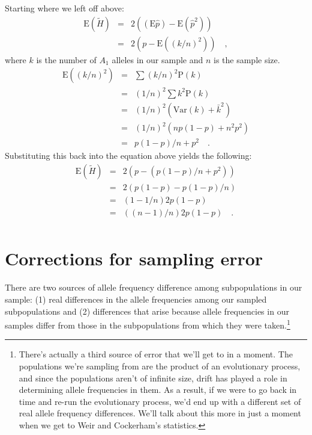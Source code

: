 \documentclass[12pt]{article}
\begin{document}
Starting where we left off above:
\begin{eqnarray*}
\mbox{E}(\tilde H) &=& 2\left((\mbox{E}\hat p) - \mbox{E}({\hat p}^2)\right) \\
     &=& 2\left(p - \mbox{E}\left((k/n)^2\right)\right) \quad ,
\end{eqnarray*}
where $k$ is the number of $A_1$ alleles in our sample and $n$ is the
sample size.
\begin{eqnarray*}
\mbox{E}\left((k/n)^2\right) &=& \sum (k/n)^2 \mbox{P}(k) \\
                      &=& (1/n)^2 \sum k^2 \mbox{P}(k) \\
                      &=& (1/n)^2 \left(\mbox{Var}(k) + \bar k^2\right) \\
                      &=& (1/n)^2 \left(np(1-p) + n^2p^2\right) \\
                      &=& p(1-p)/n + p^2 \quad .
\end{eqnarray*}
Substituting this back into the equation above yields the following:
\begin{eqnarray*}
\mbox{E}(\tilde H) &=& 2\left(p - \left(p(1-p)/n + p^2\right)\right) \\
     &=& 2\left(p(1-p) - p(1-p)/n\right) \\
     &=& \left(1 - 1/n\right)2p(1-p) \\
     &=& ((n-1)/n)2p(1-p) \quad . \\
\end{eqnarray*}

\section*{Corrections for sampling error}

There are two sources of allele frequency difference among
subpopulations in our sample: (1) real differences in the allele
frequencies among our sampled subpopulations and (2) differences that
arise because allele frequencies in our samples differ from those in
the subpopulations from which they were taken.\footnote{There's
  actually a third source of error that we'll get to in a moment. The
  populations we're sampling from are the product of an evolutionary
  process, and since the populations aren't of infinite size, drift
  has played a role in determining allele frequencies in them. As a
  result, if we were to go back in time and re-run the evolutionary
  process, we'd end up with a different set of real allele frequency
  differences. We'll talk about this more in just a moment when we get
  to Weir and Cockerham's statistics.}
\end{document}
